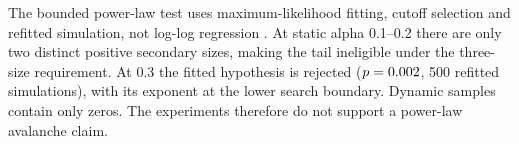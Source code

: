 The bounded power-law test uses maximum-likelihood fitting, cutoff selection
and refitted simulation, not log-log regression
\citep{clauset2009power}. At static alpha 0.1--0.2 there are only two distinct
positive secondary sizes, making the tail ineligible under the three-size
requirement. At 0.3 the fitted hypothesis is rejected
($p=0.002$, 500 refitted simulations), with its exponent at the lower
search boundary. Dynamic samples contain only zeros. The experiments therefore
do not support a power-law avalanche claim.


